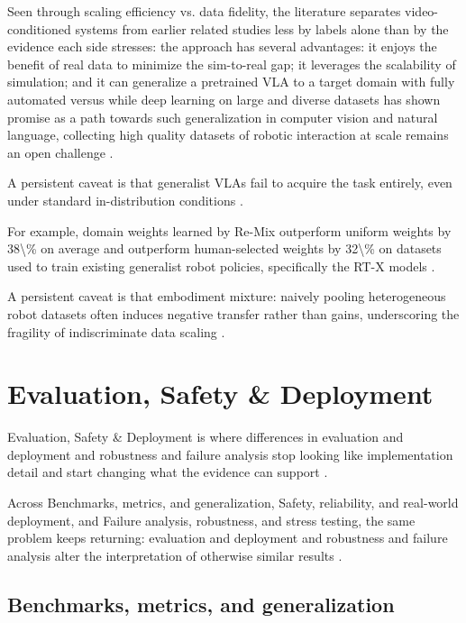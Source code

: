 \documentclass[a4paper,11pt]{article}
\begin{document}
Seen through scaling efficiency vs. data fidelity, the literature separates video-conditioned systems from earlier related studies less by labels alone than by the evidence each side stresses: the approach has several advantages: it enjoys the benefit of real data to minimize the sim-to-real gap; it leverages the scalability of simulation; and it can generalize a pretrained VLA to a target domain with fully automated versus while deep learning on large and diverse datasets has shown promise as a path towards such generalization in computer vision and natural language, collecting high quality datasets of robotic interaction at scale remains an open challenge \citep{Fang2025Rebot,Chen2021Learning,Yu2023Scaling}.

A persistent caveat is that generalist VLAs fail to acquire the task entirely, even under standard in-distribution conditions \citep{Mazza2026Improving}.

For example, domain weights learned by Re-Mix outperform uniform weights by 38\textbackslash{}\% on average and outperform human-selected weights by 32\textbackslash{}\% on datasets used to train existing generalist robot policies, specifically the RT-X models \citep{Hejna2024Optimizing}.

A persistent caveat is that embodiment mixture: naively pooling heterogeneous robot datasets often induces negative transfer rather than gains, underscoring the fragility of indiscriminate data scaling \citep{Wang2026Rethinking}.

\section{Evaluation, Safety \& Deployment}


Evaluation, Safety \& Deployment is where differences in evaluation and deployment and robustness and failure analysis stop looking like implementation detail and start changing what the evidence can support \citep{Kim2026Molmospaces,Francis2021Core,Li2026Robointer,Xu2025Anatomy}.

Across Benchmarks, metrics, and generalization, Safety, reliability, and real-world deployment, and Failure analysis, robustness, and stress testing, the same problem keeps returning: evaluation and deployment and robustness and failure analysis alter the interpretation of otherwise similar results \citep{Luo2026Being,Makarova2025Conther,Liu2026Rdt2,Chen2024Gravmad}.

\subsection{Benchmarks, metrics, and generalization}
\end{document}
